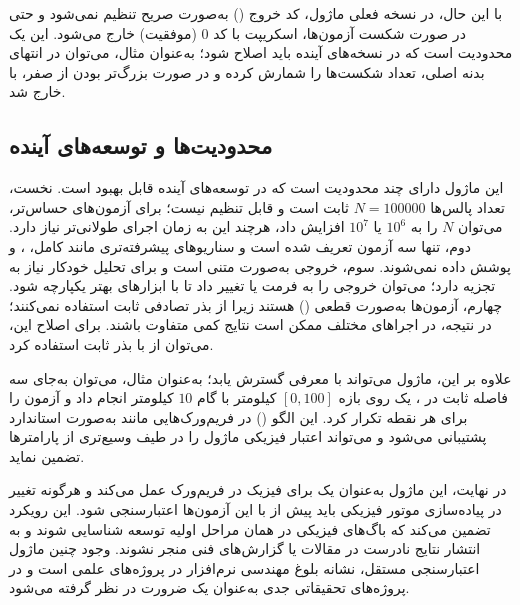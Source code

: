 با این حال، در نسخه فعلی ماژول، کد خروج () به‌صورت صریح تنظیم نمی‌شود و حتی در صورت شکست آزمون‌ها، اسکریپت با کد $0$ (موفقیت) خارج می‌شود. این یک محدودیت است که در نسخه‌های آینده باید اصلاح شود؛ به‌عنوان مثال، می‌توان در انتهای بدنه اصلی، تعداد شکست‌ها را شمارش کرده و در صورت بزرگ‌تر بودن از صفر، با  خارج شد.

\subsection{محدودیت‌ها و توسعه‌های آینده}

این ماژول دارای چند محدودیت است که در توسعه‌های آینده قابل بهبود است. نخست، تعداد پالس‌ها $N = 100000$ ثابت است و قابل تنظیم نیست؛ برای آزمون‌های حساس‌تر، می‌توان $N$ را به $10^6$ یا $10^7$ افزایش داد، هرچند این به زمان اجرای طولانی‌تر نیاز دارد. دوم، تنها سه آزمون تعریف شده است و سناریوهای پیشرفته‌تری مانند  کامل، ، و  پوشش داده نمی‌شوند. سوم، خروجی به‌صورت متنی است و برای تحلیل خودکار نیاز به تجزیه دارد؛ می‌توان خروجی را به فرمت  یا  تغییر داد تا با ابزارهای  بهتر یکپارچه شود. چهارم، آزمون‌ها به‌صورت قطعی () هستند زیرا از بذر تصادفی ثابت استفاده نمی‌کنند؛ در نتیجه، در اجراهای مختلف ممکن است نتایج کمی متفاوت باشند. برای اصلاح این، می‌توان از  با بذر ثابت استفاده کرد.

علاوه بر این، ماژول می‌تواند با معرفی  گسترش یابد؛ به‌عنوان مثال، می‌توان به‌جای سه فاصله ثابت در ، یک  روی بازه $[0, 100]$ کیلومتر با گام $10$ کیلومتر انجام داد و آزمون را برای هر نقطه تکرار کرد. این الگو () در فریم‌ورک‌هایی مانند  به‌صورت استاندارد پشتیبانی می‌شود و می‌تواند اعتبار فیزیکی ماژول را در طیف وسیع‌تری از پارامترها تضمین نماید.

در نهایت، این ماژول به‌عنوان یک  برای فیزیک  در فریم‌ورک عمل می‌کند و هرگونه تغییر در پیاده‌سازی موتور فیزیکی باید پیش از  با این آزمون‌ها اعتبارسنجی شود. این رویکرد  تضمین می‌کند که باگ‌های فیزیکی در همان مراحل اولیه توسعه شناسایی شوند و به انتشار نتایج نادرست در مقالات یا گزارش‌های فنی منجر نشوند. وجود چنین ماژول اعتبارسنجی مستقل، نشانه بلوغ مهندسی نرم‌افزار در پروژه‌های علمی است و در پروژه‌های تحقیقاتی جدی به‌عنوان یک ضرورت در نظر گرفته می‌شود.
